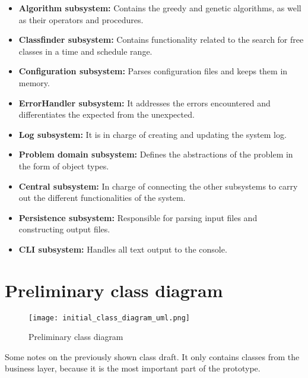 \begin{itemize}

    \item \textbf{Algorithm subsystem:} Contains the greedy and genetic algorithms, as well as their operators and procedures.

    \item \textbf{Classfinder subsystem:} Contains functionality related to the search for free classes in a time and schedule range.

    \item \textbf{Configuration subsystem:} Parses configuration files and keeps them in memory.

    \item \textbf{ErrorHandler subsystem:} It addresses the errors encountered and differentiates the expected from the unexpected.

    \item \textbf{Log subsystem:} It is in charge of creating and updating the system log.

    \item \textbf{Problem domain subsystem:} Defines the abstractions of the problem in the form of object types.

    \item \textbf{Central subsystem:} In charge of connecting the other subsystems to carry out the different functionalities of the system.

    \item \textbf{Persistence subsystem:} Responsible for parsing input files and constructing output files.

    \item \textbf{CLI subsystem:} Handles all text output to the console.

\end{itemize}




\section{Preliminary class diagram}


\begin{figure}[H]
    \caption{Preliminary class diagram}
  \centering
  \texttt{[image: initial\_class\_diagram\_uml.png]}
\end{figure}

Some notes on the previously shown class draft. It only contains classes from the business layer, because it is the most important part of the prototype.

